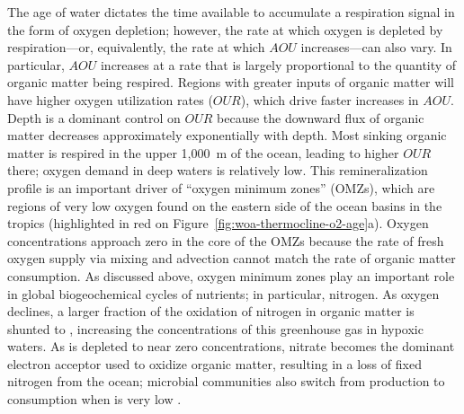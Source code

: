 \documentclass{report_chapter}
\begin{document}
The age of water dictates the time available to accumulate a respiration signal in the form of oxygen depletion; however, the rate at which oxygen is depleted by respiration---or, equivalently, the rate at which $AOU$ increases---can also vary.
In particular, $AOU$ increases at a rate that is largely proportional to the quantity of organic matter being respired.
Regions with greater inputs of organic matter will have higher oxygen utilization rates ($OUR$), which drive faster increases in $AOU$.
Depth is a dominant control on $OUR$ because the downward flux of organic matter decreases approximately exponentially with depth.
Most sinking organic matter is respired in the upper 1,000~m of the ocean, leading to higher $OUR$ there; oxygen demand in deep waters is relatively low.
This remineralization profile is an important driver of ``oxygen minimum zones'' (OMZs), which are regions of very low oxygen found on the eastern side of the ocean basins in the tropics (highlighted in red on Figure~\ref{fig:woa-thermocline-o2-age}a).
Oxygen concentrations approach zero in the core of the OMZs because the rate of fresh oxygen supply via mixing and advection cannot match the rate of organic matter consumption.
As discussed above, oxygen minimum zones play an important role in global biogeochemical cycles of nutrients; in particular, nitrogen.
As oxygen declines, a larger fraction of the oxidation of nitrogen in organic matter is shunted to \NNO{}, increasing the concentrations of this greenhouse gas in hypoxic waters.
As \OO{} is depleted to near zero concentrations, nitrate becomes the dominant electron acceptor used to oxidize organic matter, resulting in a loss of fixed nitrogen from the ocean; microbial communities also switch from \NNO{} production to consumption when \OO{} is very low \citep{Codispoti-2010}.
\end{document}
